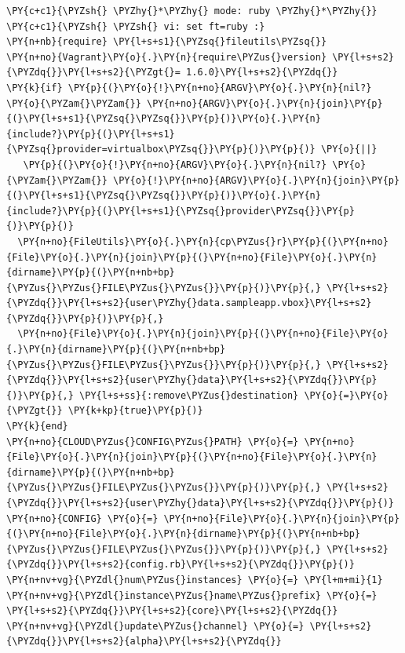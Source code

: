 \begin{codelisting}
\label{code:cloud-config1}
\begin{Verbatim}[fontsize=\relsize{-2.5},fontseries=b,commandchars=\\\{\}]
\PY{c+c1}{\PYZsh{} \PYZhy{}*\PYZhy{} mode: ruby \PYZhy{}*\PYZhy{}}
\PY{c+c1}{\PYZsh{} \PYZsh{} vi: set ft=ruby :}
\PY{n+nb}{require} \PY{l+s+s1}{\PYZsq{}fileutils\PYZsq{}}
\PY{n+no}{Vagrant}\PY{o}{.}\PY{n}{require\PYZus{}version} \PY{l+s+s2}{\PYZdq{}}\PY{l+s+s2}{\PYZgt{}= 1.6.0}\PY{l+s+s2}{\PYZdq{}}
\PY{k}{if} \PY{p}{(}\PY{o}{!}\PY{n+no}{ARGV}\PY{o}{.}\PY{n}{nil?} \PY{o}{\PYZam{}\PYZam{}} \PY{n+no}{ARGV}\PY{o}{.}\PY{n}{join}\PY{p}{(}\PY{l+s+s1}{\PYZsq{}\PYZsq{}}\PY{p}{)}\PY{o}{.}\PY{n}{include?}\PY{p}{(}\PY{l+s+s1}{\PYZsq{}provider=virtualbox\PYZsq{}}\PY{p}{)}\PY{p}{)} \PY{o}{||} 
   \PY{p}{(}\PY{o}{!}\PY{n+no}{ARGV}\PY{o}{.}\PY{n}{nil?} \PY{o}{\PYZam{}\PYZam{}} \PY{o}{!}\PY{n+no}{ARGV}\PY{o}{.}\PY{n}{join}\PY{p}{(}\PY{l+s+s1}{\PYZsq{}\PYZsq{}}\PY{p}{)}\PY{o}{.}\PY{n}{include?}\PY{p}{(}\PY{l+s+s1}{\PYZsq{}provider\PYZsq{}}\PY{p}{)}\PY{p}{)}
  \PY{n+no}{FileUtils}\PY{o}{.}\PY{n}{cp\PYZus{}r}\PY{p}{(}\PY{n+no}{File}\PY{o}{.}\PY{n}{join}\PY{p}{(}\PY{n+no}{File}\PY{o}{.}\PY{n}{dirname}\PY{p}{(}\PY{n+nb+bp}{\PYZus{}\PYZus{}FILE\PYZus{}\PYZus{}}\PY{p}{)}\PY{p}{,} \PY{l+s+s2}{\PYZdq{}}\PY{l+s+s2}{user\PYZhy{}data.sampleapp.vbox}\PY{l+s+s2}{\PYZdq{}}\PY{p}{)}\PY{p}{,}
  \PY{n+no}{File}\PY{o}{.}\PY{n}{join}\PY{p}{(}\PY{n+no}{File}\PY{o}{.}\PY{n}{dirname}\PY{p}{(}\PY{n+nb+bp}{\PYZus{}\PYZus{}FILE\PYZus{}\PYZus{}}\PY{p}{)}\PY{p}{,} \PY{l+s+s2}{\PYZdq{}}\PY{l+s+s2}{user\PYZhy{}data}\PY{l+s+s2}{\PYZdq{}}\PY{p}{)}\PY{p}{,} \PY{l+s+ss}{:remove\PYZus{}destination} \PY{o}{=}\PY{o}{\PYZgt{}} \PY{k+kp}{true}\PY{p}{)}
\PY{k}{end}
\PY{n+no}{CLOUD\PYZus{}CONFIG\PYZus{}PATH} \PY{o}{=} \PY{n+no}{File}\PY{o}{.}\PY{n}{join}\PY{p}{(}\PY{n+no}{File}\PY{o}{.}\PY{n}{dirname}\PY{p}{(}\PY{n+nb+bp}{\PYZus{}\PYZus{}FILE\PYZus{}\PYZus{}}\PY{p}{)}\PY{p}{,} \PY{l+s+s2}{\PYZdq{}}\PY{l+s+s2}{user\PYZhy{}data}\PY{l+s+s2}{\PYZdq{}}\PY{p}{)}
\PY{n+no}{CONFIG} \PY{o}{=} \PY{n+no}{File}\PY{o}{.}\PY{n}{join}\PY{p}{(}\PY{n+no}{File}\PY{o}{.}\PY{n}{dirname}\PY{p}{(}\PY{n+nb+bp}{\PYZus{}\PYZus{}FILE\PYZus{}\PYZus{}}\PY{p}{)}\PY{p}{,} \PY{l+s+s2}{\PYZdq{}}\PY{l+s+s2}{config.rb}\PY{l+s+s2}{\PYZdq{}}\PY{p}{)}
\PY{n+nv+vg}{\PYZdl{}num\PYZus{}instances} \PY{o}{=} \PY{l+m+mi}{1}
\PY{n+nv+vg}{\PYZdl{}instance\PYZus{}name\PYZus{}prefix} \PY{o}{=} \PY{l+s+s2}{\PYZdq{}}\PY{l+s+s2}{core}\PY{l+s+s2}{\PYZdq{}}
\PY{n+nv+vg}{\PYZdl{}update\PYZus{}channel} \PY{o}{=} \PY{l+s+s2}{\PYZdq{}}\PY{l+s+s2}{alpha}\PY{l+s+s2}{\PYZdq{}}

\end{Verbatim}
\end{codelisting}
